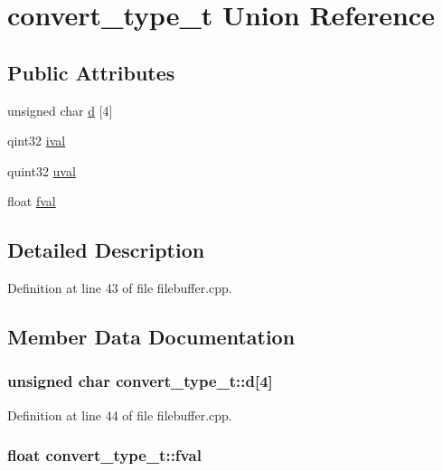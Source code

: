 \hypertarget{unionconvert__type__t}{\section{convert\-\_\-type\-\_\-t Union Reference}
\label{unionconvert__type__t}
}
\subsection*{Public Attributes}
\begin{DoxyCompactItemize}
\item 
unsigned char \hyperlink{unionconvert__type__t_a4fcd24be201830134d26395d6472f105}{d} \mbox{[}4\mbox{]}
\item 
qint32 \hyperlink{unionconvert__type__t_a23001696f165130f03d305c2bc1442eb}{ival}
\item 
quint32 \hyperlink{unionconvert__type__t_a589a9a481a1889a166442e985519ac7c}{uval}
\item 
float \hyperlink{unionconvert__type__t_aa56281b3a5e206689c30ce623aa6dc0b}{fval}
\end{DoxyCompactItemize}


\subsection{Detailed Description}


Definition at line 43 of file filebuffer.\-cpp.



\subsection{Member Data Documentation}
\hypertarget{unionconvert__type__t_a4fcd24be201830134d26395d6472f105}{
\subsubsection[{d}]{\setlength{\rightskip}{0pt plus 5cm}unsigned char convert\-\_\-type\-\_\-t\-::d\mbox{[}4\mbox{]}}}\label{unionconvert__type__t_a4fcd24be201830134d26395d6472f105}


Definition at line 44 of file filebuffer.\-cpp.

\hypertarget{unionconvert__type__t_aa56281b3a5e206689c30ce623aa6dc0b}{
\subsubsection[{fval}]{\setlength{\rightskip}{0pt plus 5cm}float convert\-\_\-type\-\_\-t\-::fval}}\label{unionconvert__type__t_aa56281b3a5e206689c30ce623aa6dc0b}


